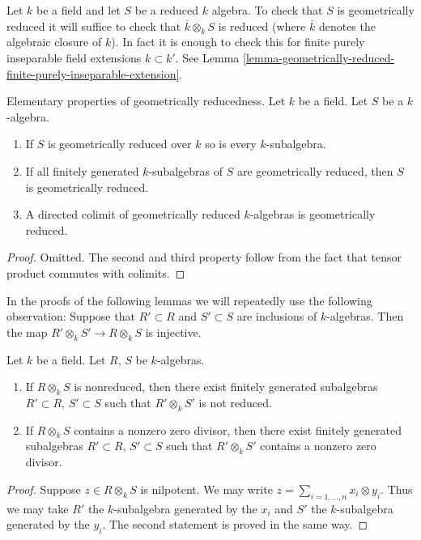 \noindent
Let $k$ be a field and let $S$ be a reduced $k$ algebra.
To check that $S$ is geometrically reduced it will suffice
to check that $\overline{k} \otimes_k S$ is reduced (where
$\overline{k}$ denotes the algebraic closure of $k$).
In fact it is enough to check this for finite purely inseparable
field extensions $k \subset k'$. See
Lemma \ref{lemma-geometrically-reduced-finite-purely-inseparable-extension}.

\begin{lemma}
\label{lemma-subalgebra-separable}
Elementary properties of geometrically reducedness.
Let $k$ be a field. Let $S$ be a $k$-algebra.
\begin{enumerate}
\item If $S$ is geometrically reduced over $k$ so is every
$k$-subalgebra.
\item If all finitely generated $k$-subalgebras of $S$ are
geometrically reduced, then $S$ is geometrically reduced.
\item A directed colimit of geometrically reduced $k$-algebras
is geometrically reduced.
\end{enumerate}
\end{lemma}

\begin{proof}
Omitted. The second and third property follow from the fact that
tensor product commutes with colimits.
\end{proof}

\noindent
In the proofs of the following lemmas we will repeatedly use
the following observation: Suppose that $R' \subset R$ and
$S' \subset S$ are inclusions of $k$-algebras.
Then the map $R' \otimes_k S' \to R \otimes_k S$
is injective.

\begin{lemma}
\label{lemma-limit-argument}
Let $k$ be a field. Let $R$, $S$ be $k$-algebras.
\begin{enumerate}
\item If $R \otimes_k S$ is nonreduced, then there exist
finitely generated subalgebras $R' \subset R$,
$S' \subset S$ such that $R' \otimes_k S'$ is not reduced.
\item If $R \otimes_k S$ contains a nonzero zero divisor, then there exist
finitely generated subalgebras $R' \subset R$,
$S' \subset S$ such that $R' \otimes_k S'$ contains a nonzero zero divisor.
\end{enumerate}
\end{lemma}

\begin{proof}
Suppose $z \in R \otimes_k S$ is nilpotent. We may write
$z = \sum_{i = 1, \ldots, n} x_i \otimes y_i$.
Thus we may take $R'$ the $k$-subalgebra generated by
the $x_i$ and $S'$ the $k$-subalgebra generated by the $y_i$.
The second statement is proved in the same way.
\end{proof}

